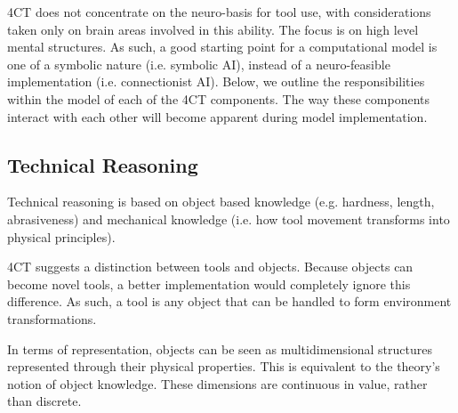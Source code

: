 \documentclass[11]{article}
\begin{document}
4CT does not concentrate on the neuro-basis for tool use, with considerations taken only on brain areas involved in this ability. The focus is on high level mental structures. As such, a good starting point for a computational model is one of a symbolic nature (i.e. symbolic AI), instead of a neuro-feasible implementation (i.e. connectionist AI)\cite{smolensky87}. Below, we outline the responsibilities within the model of each of the 4CT components. The way these components interact with each other will become apparent during model implementation.

\subsection{Technical Reasoning}

Technical reasoning is based on object based knowledge (e.g. hardness, length, abrasiveness) and mechanical knowledge (i.e. how tool movement transforms into physical principles)\cite{osiurak2014}.

4CT suggests a distinction between tools and objects.  Because objects can become novel tools, a better implementation would completely ignore this difference. As such, a tool is any object that can be handled to form environment transformations. 

In terms of representation, objects can be seen as multidimensional structures represented through their physical properties. This is equivalent to the theory's notion of object knowledge. These dimensions are continuous in value, rather than discrete. 
\end{document}
